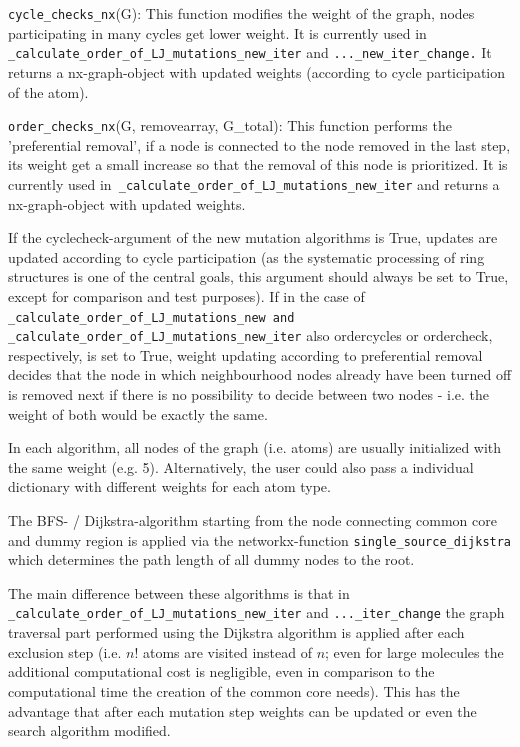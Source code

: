 \texttt{cycle\_checks\_nx}(G): This function modifies the weight of
the graph, nodes participating in many cycles get lower weight. It
is currently used in \texttt{\_calculate\_order\_of\_LJ\_mutations\_new\_iter}
and \texttt{...\_new\_iter\_change.} It returns a nx-graph-object
with updated weights (according to cycle participation of the atom).

\texttt{order\_checks\_nx}(G, removearray, G\_total): This function
performs the 'preferential removal', if a node is connected to the
node removed in the last step, its weight get a small increase so
that the removal of this node is prioritized. It is currently used
in\texttt{ \_calculate\_order\_of\_LJ\_mutations\_new\_iter} and returns
a nx-graph-object with updated weights.

If the cyclecheck-argument of the new mutation algorithms is True,
updates are updated according to cycle participation (as the systematic
processing of ring structures is one of the central goals, this argument
should always be set to True, except for comparison and test purposes).
If in the case of \texttt{\_calculate\_order\_of\_LJ\_mutations\_new
and \_calculate\_order\_of\_LJ\_mutations\_new\_iter} also ordercycles
or ordercheck, respectively, is set to True, weight updating according
to preferential removal decides that the node in which neighbourhood
nodes already have been turned off is removed next if there is no
possibility to decide between two nodes - i.e. the weight of both
would be exactly the same.

In each algorithm, all nodes of the graph (i.e. atoms) are usually
initialized with the same weight (e.g. 5). Alternatively, the user
could also pass a individual dictionary with different weights for
each atom type.

The BFS- / Dijkstra-algorithm starting from the node connecting common
core and dummy region is applied via the networkx-function \texttt{single\_source\_dijkstra}
which determines the path length of all dummy nodes to the root.

The main difference between these algorithms is that in \texttt{\_calculate\_order\_of\_LJ\_mutations\_new\_iter}
and \texttt{...\_iter\_change} the graph traversal part performed
using the Dijkstra algorithm is applied after each exclusion step
(i.e. $n!$ atoms are visited instead of $n$; even for large molecules
the additional computational cost is negligible, even in comparison
to the computational time the creation of the common core needs).
This has the advantage that after each mutation step weights can be
updated or even the search algorithm modified. 


